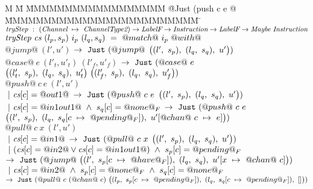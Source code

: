 

\begin{figure*}
\begin{tabbing}
M \= M \= MMMMMMMMMMMMMMMMMM \= @Just (push c e @ \= MMMMMMMMMMMMMMMMMMMMMMMMM \= \kill
$\ti{tryStep} ~:~ \ChanTypeMap \to \LabelF \to \Instr \to \LabelF \to \Maybe~\Instr$ \\
$\ti{tryStep} ~\cs~(l_p,s_p)~i_p~(l_q,s_q)~=~@match@~i_p~@with@$ \\

\> $@jump@~(l',u')$ 
\> \> $\to~\Just (@jump@$ \> $
      \nextStep
        {l'}{s_p}
        {l_q}{s_q}
        {u'})
      $ 
\> 
\\[1ex]

\> $@case@~e~(l'_t,u'_t)~(l'_f,u'_f)$
\> \> $\to~\Just (@case@~e$ \> $
      \nextStep
        {l'_t}{s_p}
        {l_q}{s_q}
        {u'_t}
      ~
      \nextStep
        {l'_f}{s_p}
        {l_q}{s_q}
        {u'_f})
      $ 
\> 
\\[1ex]

\> $@push@~c~e~(l',u')$ \\
\> \> $~|~\cs[c]=@out1@$ 
\> $\to~\Just (@push@~c~e$ \> $
      \nextStep
        {l'}
          {s_p}
        {l_q}
          {s_q}
        {u'})
      $ 
\> \\

\> \> $~|~\cs[c]=@in1out1@ ~\wedge~ s_q[c]=@none@_F$ 
\> $\to~\Just (@push@~c~e$ \> $
      \nextStep
        {l'}
          {s_p}
        {l_q}
          {\HeapUpdateOne{c}{@pending@_F}{s_q}}
        {\HeapUpdateOne{@chan@~c}{e}{u'}})
      $
\> 
\\[1ex]


\> $@pull@~c~x~(l',u')$ \\
\> \> $~|~\cs[c]=@in1@$ 
\> $\to~\Just (@pull@~c~x$ \> $
      \nextStep
        {l'}{s_p}
        {l_q}{s_q}
        {u'})
    $ 
\> 
\\[1ex]

\> \> $~|~(\cs[c]=@in2@ \vee \cs[c]=@in1out1@) ~\wedge~ s_p[c]=@pending@_F$ \\
\> \> $\to~\Just (@jump@~
      \nextStep
        {l'}
          {\HeapUpdateOne{c}{@have@_F}{s_p}}
        {l_q}
          {s_q}
        {\HeapUpdateOne{x}{@chan@~c}{u'}})
        $ 
\> \> \>  
\\[1ex]

\> \> $~|~\cs[c]=@in2@ ~\wedge~ s_p[c]=@none@_F ~\wedge~ s_q[c]=@none@_F$ \\
\> \> $\to~\Just (@pull@~c~(@chan@~c)~
      \nextStep
        {l_p}
          {\HeapUpdateOne{c}{@pending@_F}{s_p}}
        {l_q}
          {\HeapUpdateOne{c}{@pending@_F}{s_q}}
        {[]})
  $
\> \> \> 
\\[1ex]


\end{tabbing}
\end{figure*}
